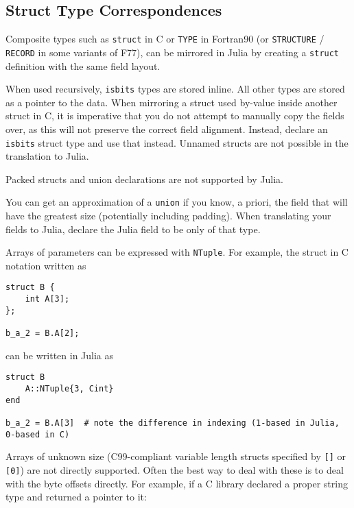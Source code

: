 \subsection{Struct Type Correspondences}



Composite types such as \texttt{struct} in C or \texttt{TYPE} in Fortran90 (or \texttt{STRUCTURE} / \texttt{RECORD} in some variants of F77), can be mirrored in Julia by creating a \texttt{struct} definition with the same field layout.



When used recursively, \texttt{isbits} types are stored inline. All other types are stored as a pointer to the data. When mirroring a struct used by-value inside another struct in C, it is imperative that you do not attempt to manually copy the fields over, as this will not preserve the correct field alignment. Instead, declare an \texttt{isbits} struct type and use that instead. Unnamed structs are not possible in the translation to Julia.



Packed structs and union declarations are not supported by Julia.



You can get an approximation of a \texttt{union} if you know, a priori, the field that will have the greatest size (potentially including padding). When translating your fields to Julia, declare the Julia field to be only of that type.



Arrays of parameters can be expressed with \texttt{NTuple}.  For example, the struct in C notation written as




\begin{lstlisting}
struct B {
    int A[3];
};

b_a_2 = B.A[2];
\end{lstlisting}



can be written in Julia as




\begin{verbatim}
struct B
    A::NTuple{3, Cint}
end

b_a_2 = B.A[3]  # note the difference in indexing (1-based in Julia, 0-based in C)
\end{verbatim}



Arrays of unknown size (C99-compliant variable length structs specified by \texttt{[]} or \texttt{[0]}) are not directly supported. Often the best way to deal with these is to deal with the byte offsets directly. For example, if a C library declared a proper string type and returned a pointer to it:




